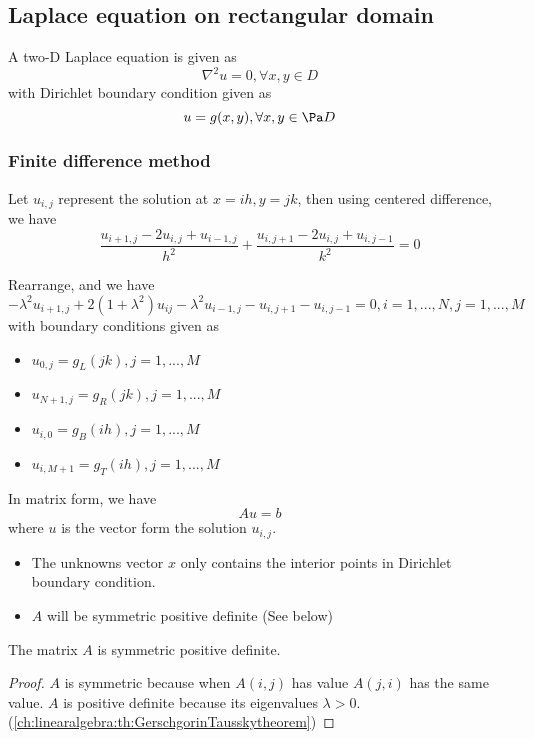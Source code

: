 \begin{refsection}
\subsection{Laplace equation on rectangular domain}
\begin{definition}
A two-D Laplace equation is given as
$$\nabla^2 u = 0,\forall x,y \in D$$
with Dirichlet boundary condition given as
$$u = g(x,y), \forall x,y\in \Pa D$$
\end{definition}


\subsubsection{Finite difference method}
\begin{definition}
Let $u_{i,j}$ represent the solution at $x = ih, y = jk$, then using centered difference, we have
$$\frac{u_{i+1,j}-2u_{i,j} + u_{i-1,j}}{h^2} + \frac{u_{i,j+1}-2u_{i,j} + u_{i,j-1}}{k^2} = 0$$

Rearrange, and we have
$$-\lambda^2 u_{i+1,j} + 2(1+\lambda^2)u_{ij} - \lambda^2 u_{i-1,j} - u_{i,j+1} - u_{i,j-1} = 0,i=1,...,N,j=1,...,M$$
with boundary conditions given as 
\begin{itemize}
	\item $u_{0,j} = g_L(jk),j=1,...,M$
	\item $u_{N+1,j} = g_R(jk),j=1,...,M$
	\item $u_{i,0} = g_B(ih),j=1,...,M$
	\item $u_{i,M+1} = g_T(ih),j=1,...,M$
\end{itemize}

In matrix form, we have 
$$Au = b$$
where $u$ is the vector form the solution $u_{i,j}$.
\end{definition}

\begin{remark}[implications]\hfill
\begin{itemize}
    \item The unknowns vector $x$ only contains the interior points in Dirichlet boundary condition.
    \item $A$ will be symmetric positive definite (See below)
\end{itemize}
\end{remark}

\begin{lemma}\cite[190]{holmes2007introduction}
The matrix $A$ is symmetric positive definite.
\end{lemma}
\begin{proof}
$A$ is symmetric because when $A(i,j)$ has value $A(j,i)$ has the same value. $A$ is positive definite because its eigenvalues $\lambda > 0$.(\autoref{ch:linearalgebra:th:GerschgorinTausskytheorem})
\end{proof}




\end{refsection}
